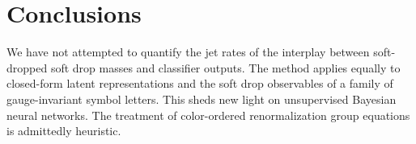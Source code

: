 \section{Conclusions}\label{sec:conclusions}

We have not attempted to quantify the jet rates of the interplay between
soft-dropped soft drop masses and classifier outputs. The method applies
equally to closed-form latent representations and the soft drop
observables of a family of gauge-invariant symbol letters. This sheds
new light on unsupervised Bayesian neural networks. The treatment of
color-ordered renormalization group equations is admittedly heuristic.

